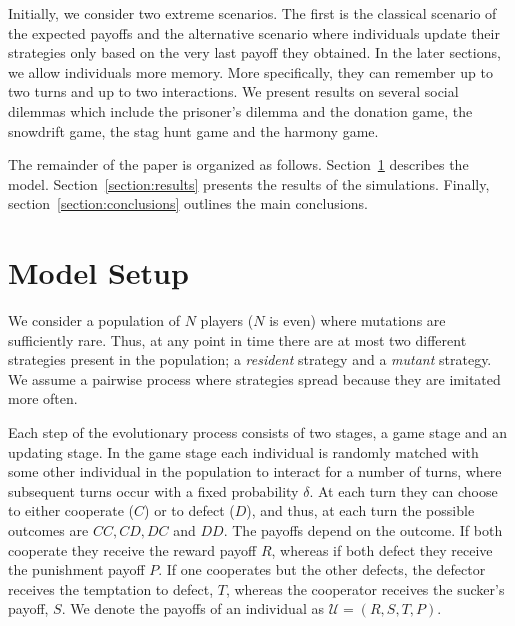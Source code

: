 \documentclass[11pt]{article}
\theoremstyle{plainCl1}
\theoremstyle{plainCl2}
\begin{document}
Initially, we consider two extreme scenarios. The first is the classical
scenario of the expected payoffs and the alternative scenario where individuals
update their strategies only based on the very last payoff they obtained. In the
later sections, we allow individuals more memory. More specifically, they can
remember up to two turns and up to two interactions.
We present results on  several social dilemmas which include the prisoner's
dilemma and the donation game, the snowdrift game, the stag hunt game and the
harmony game.

The remainder of the paper is organized as follows. Section~\ref{section:model}
describes the model. Section~\ref{section:results} presents the results of the
simulations. Finally, section~\ref{section:conclusions} outlines the main
conclusions.


\section{Model Setup}\label{section:model}

We consider a population of \(N\) players (\(N\) is even) where mutations are
sufficiently rare. Thus, at any point in time there are at most two
different strategies present in the population; a \textit{resident} strategy
and a \textit{mutant} strategy. We assume a pairwise process where
strategies spread because they are imitated more often.

Each step of the evolutionary process consists of two stages, a game stage and
an updating stage. In the game stage each individual is randomly matched with
some other individual in the population to interact for a number of turns, where
subsequent turns occur with a fixed probability $\delta$. At each turn they
can choose to either cooperate (\(C\)) or to defect (\(D\)), and thus, at
each turn the possible outcomes are \(CC, CD, DC\) and \(DD\). The payoffs
depend on the outcome. If both cooperate they receive the reward payoff
\(R\), whereas if both defect they receive the punishment payoff \(P\).
If one cooperates but the other defects, the defector receives the temptation to
defect, \(T\), whereas the cooperator receives the sucker's payoff, \(S\).
We denote the payoffs of an individual as \(\mathcal{U} = (R, S, T, P)\).
\end{document}

